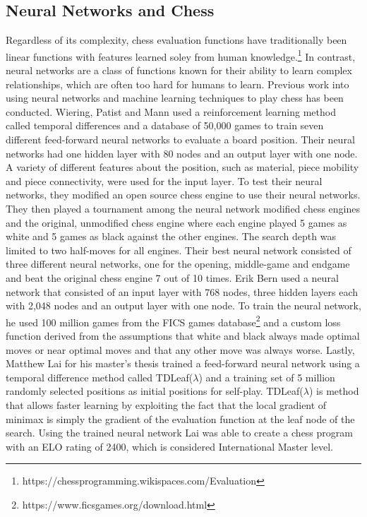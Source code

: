 \documentclass[12pt]{article}
\begin{document}
\subsection{Neural Networks and Chess}
Regardless of its complexity, chess evaluation functions have traditionally been linear functions with features learned soley from human knowledge.\footnote{https://chessprogramming.wikispaces.com/Evaluation} In contrast, neural networks are a class of functions known for their ability to learn complex relationships, which are often too hard for humans to learn. Previous work into using neural networks and machine learning techniques to play chess has been conducted. Wiering, Patist and Mann \cite{wiering} used a reinforcement learning method called temporal differences and a database of 50,000 games to train seven different feed-forward neural networks to evaluate a board position. Their neural networks had one hidden layer with 80 nodes and an output layer with one node. A variety of different features about the position, such as material, piece mobility and piece connectivity, were used for the input layer. To test their neural networks, they modified an open source chess engine to use their neural networks. They then played a tournament among the neural network modified chess engines and the original, unmodified chess engine where each engine played 5 games as white and 5 games as black against the other engines. The search depth was limited to two half-moves for all engines. Their best neural network consisted of three different neural networks, one for the opening, middle-game and endgame and beat the original chess engine 7 out of 10 times. Erik Bern \cite{bern} used a neural network that consisted of an input layer with 768 nodes, three hidden layers each with 2,048 nodes and an output layer with one node. To train the neural network, he used 100 million games from the FICS games database\footnote{https://www.ficsgames.org/download.html} and a custom loss function derived from the assumptions that white and black always made optimal moves or near optimal moves and that any other move was always worse. Lastly, Matthew Lai \cite{lai} for his master's thesis trained a feed-forward neural network using a temporal difference method called TDLeaf($\lambda$) and a training set of 5 million randomly selected positions as initial positions for self-play. TDLeaf($\lambda$) is method that allows faster learning by exploiting the fact that the local gradient of minimax is simply the gradient of the evaluation function at the leaf node of the search. Using the trained neural network Lai was able to create a chess program with an ELO rating of 2400, which is considered International Master level.
\end{document}
